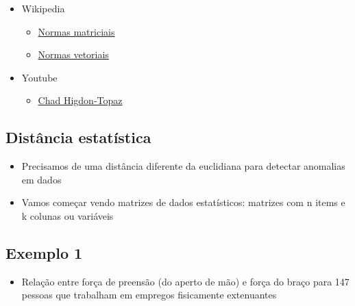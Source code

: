 \documentclass[
  letterpaper,
  DIV=11,
  numbers=noendperiod]{scrartcl}
\providecommand{\tightlist}{%
  \setlength{\itemsep}{0pt}\setlength{\parskip}{0pt}}\usepackage{longtable,booktabs,array}
\begin{document}
\begin{itemize}
\tightlist
\item
  Wikipedia

  \begin{itemize}
  \tightlist
  \item
    \href{https://en.wikipedia.org/wiki/Norm_(mathematics)}{Normas
    matriciais}
  \item
    \href{https://en.wikipedia.org/wiki/Norm_(mathematics)}{Normas
    vetoriais}
  \end{itemize}
\item
  Youtube

  \begin{itemize}
  \tightlist
  \item
    \href{https://youtu.be/UtNPmGw60jg}{Chad Higdon-Topaz}
  \end{itemize}
\end{itemize}

\hypertarget{distuxe2ncia-estatuxedstica}{%
\subsection{Distância estatística}\label{distuxe2ncia-estatuxedstica}}

\begin{itemize}
\tightlist
\item
  Precisamos de uma distância diferente da euclidiana para detectar
  anomalias em dados
\item
  Vamos começar vendo matrizes de dados estatísticos: matrizes com n
  items e k colunas ou variáveis
\end{itemize}

\hypertarget{exemplo-1}{%
\subsection{Exemplo 1}\label{exemplo-1}}

\begin{itemize}
\tightlist
\item
  Relação entre força de preensão (do aperto de mão) e força do braço
  para 147 pessoas que trabalham em empregos fisicamente extenuantes
\end{itemize}
\end{document}
